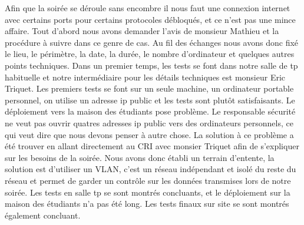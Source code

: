 Afin que la soirée se déroule sans encombre il nous faut une connexion internet avec certains ports pour certains protocoles débloqués,
et ce n'est pas une mince affaire. Tout d'abord nous avons demander l'avis de monsieur Mathieu et la procédure à suivre dans ce genre de cas.
Au fil des échanges nous avons donc fixé le lieu, le périmètre, la date, la durée, le nombre d'ordinateur et quelques autres points techniques.
Dans un premier temps, les tests se font dans notre salle de tp habituelle et notre intermédiaire pour les détails techniques est monsieur Eric Triquet.
Les premiers tests se font sur un seule machine, un ordinateur portable personnel, on utilise un adresse ip public et les tests sont plutôt satisfaisants.
Le déploiement vers la maison des étudiants pose problème. Le responsable sécurité ne veut pas ouvrir quatres adresses ip public vers des ordinateurs personnels,
ce qui veut dire que nous devons penser à autre chose.
La solution à ce problème a été trouver en allant directement au CRI avec monsier Triquet afin de s'expliquer sur les besoins de la soirée.
Nous avons donc établi un terrain d'entente, la solution est d'utiliser un VLAN, c'est un réseau indépendant et isolé du reste du réseau et permet de garder
un contrôle sur les données transmises lors de notre soirée.
Les tests en salle tp se sont montrés concluants, et le déploiement sur la maison des étudiants n'a pas été long.
Les tests finaux sur site se sont montrés également concluant.
